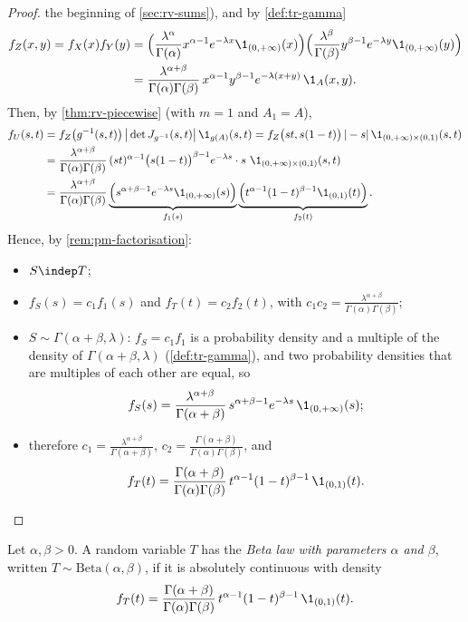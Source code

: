 \begin{proof}
the beginning of \cref{sec:rv-sums}), and by \cref{def:tr-gamma}
\[
\begin{aligned}
  f_Z(x,y)=f_X(x)f_Y(y)&=\Big(\frac{\lambda^\alpha}{\Gamma(\alpha)}x^{\alpha-1}e^{-\lambda x}\1_{(0,+\infty)}(x)\Big)
  \Big(\frac{\lambda^\beta}{\Gamma(\beta)}y^{\beta-1}e^{-\lambda y}\1_{(0,+\infty)}(y)\Big)\\
  &=\frac{\lambda^{\alpha+\beta}}{\Gamma(\alpha)\Gamma(\beta)}\,x^{\alpha-1}y^{\beta-1}e^{-\lambda(x+y)}\,\1_A(x,y).
\end{aligned}
\]
Then, by \cref{thm:rv-piecewise} (with $m=1$ and $A_1=A$),
\[
\begin{aligned}
  f_U(s,t)&=f_Z\big(g^{-1}(s,t)\big)\,\big|\det J_{g^{-1}}(s,t)\big|\,\1_{g(A)}(s,t)
  =f_Z\big(st,s(1-t)\big)\,|-s|\,\1_{(0,+\infty)\times(0,1)}(s,t)\\
  &=\frac{\lambda^{\alpha+\beta}}{\Gamma(\alpha)\Gamma(\beta)}\,(st)^{\alpha-1}\big(s(1-t)\big)^{\beta-1}
  e^{-\lambda s}\cdot s\ \1_{(0,+\infty)\times(0,1)}(s,t)\\
  &=\frac{\lambda^{\alpha+\beta}}{\Gamma(\alpha)\Gamma(\beta)}
  \underbrace{\Big(s^{\alpha+\beta-1}e^{-\lambda s}\1_{(0,+\infty)}(s)\Big)}_{f_1(s)}
  \underbrace{\Big(t^{\alpha-1}(1-t)^{\beta-1}\1_{(0,1)}(t)\Big)}_{f_2(t)} .
\end{aligned}
\]
Hence, by \cref{rem:pm-factorisation}:
\begin{itemize}
  \item $S\indep T$;
  \item $f_S(s)=c_1f_1(s)$ and $f_T(t)=c_2f_2(t)$, with
    $c_1c_2=\frac{\lambda^{\alpha+\beta}}{\Gamma(\alpha)\Gamma(\beta)}$;
  \item $S\sim\Gamma(\alpha+\beta,\lambda)$: $f_S=c_1f_1$ is a probability density and a multiple of the
    density of $\Gamma(\alpha+\beta,\lambda)$ (\cref{def:tr-gamma}), and two probability densities that
    are multiples of each other are equal, so
    \[
      f_S(s)=\frac{\lambda^{\alpha+\beta}}{\Gamma(\alpha+\beta)}\,s^{\alpha+\beta-1}e^{-\lambda s}\,\1_{(0,+\infty)}(s);
    \]
  \item therefore $c_1=\frac{\lambda^{\alpha+\beta}}{\Gamma(\alpha+\beta)}$,
    $c_2=\frac{\Gamma(\alpha+\beta)}{\Gamma(\alpha)\Gamma(\beta)}$, and
    \[
      f_T(t)=\frac{\Gamma(\alpha+\beta)}{\Gamma(\alpha)\Gamma(\beta)}\,t^{\alpha-1}(1-t)^{\beta-1}\,\1_{(0,1)}(t).
      \qedhere
    \]
\end{itemize}
\end{proof}

\begin{definition}\label{def:rv-beta}
Let $\alpha,\beta>0$. A random variable $T$ has the \emph{Beta law with parameters $\alpha$ and
$\beta$}, written $T\sim\mathrm{Beta}(\alpha,\beta)$, if it is absolutely continuous with density
\[
  f_T(t)=\frac{\Gamma(\alpha+\beta)}{\Gamma(\alpha)\Gamma(\beta)}\,t^{\alpha-1}(1-t)^{\beta-1}\,\1_{(0,1)}(t).
\]
\end{definition}

